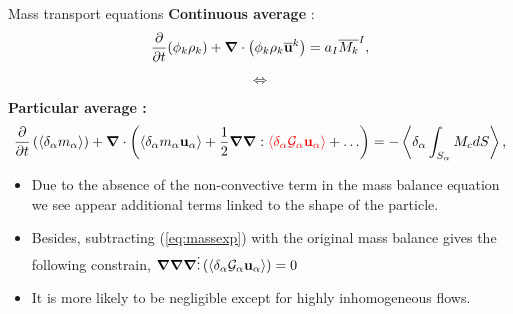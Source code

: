 \documentclass{sintefbeamer}
\newcommand{\nablab}{\bm{\nabla}}
\begin{document}
\begin{frame}
  {Mass transport equations}
  \textbf{Continuous average} :
  \begin{equation}
    \pddt (\phi_k \rho_k)
    + \nablab \cdot \left(\phi_k \rho_k 
        \kavg{\textbf{u}}
    \right) 
    = a_I\Iavg{M_k},
\end{equation}

  \begin{center}
    \begin{equation*}
      \Longleftrightarrow 
    \end{equation*}
  \end{center}
  \textbf{Particular average :}
  \begin{equation}
    \pddt   \left(\pavg{m_\alpha}\right)
    + \nablab \cdot \left(\pavg{m_\alpha \textbf{u}_\alpha} 
    + \frac{1}{2}\nablab\nablab : 
    \textcolor{red}{\pavg{ \mathcal{G}_\alpha\textbf{u}_\alpha}}
    + \ldots
    \right) 
    = -\pavg{\int_{S_\alpha} M_c d S},
    \label{eq:massexp}
\end{equation}

\begin{itemize}
  \item Due to the absence of the non-convective term in the mass balance equation we see appear additional terms linked to the shape of the particle. 
  \item Besides, subtracting (\ref{eq:massexp}) with the original mass balance gives the following constrain, $\nablab\nablab\nablab \vdots \left(\pavg{ \mathcal{G}_\alpha\textbf{u}_\alpha}\right) = 0$
  \item It is more likely to be negligible except for highly inhomogeneous flows. 
\end{itemize}
\end{frame}
\end{document}
